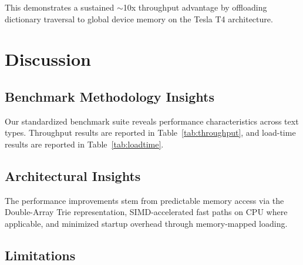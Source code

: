 \documentclass[11pt,a4paper,twocolumn]{article}
\begin{document}
This demonstrates a sustained $\sim$10x throughput advantage by offloading dictionary traversal to global device memory on the Tesla T4 architecture.

\section{Discussion}
\label{sec:discussion}

\subsection{Benchmark Methodology Insights}

Our standardized benchmark suite reveals performance characteristics across text types. Throughput results are reported in Table~\ref{tab:throughput}, and load-time results are reported in Table~\ref{tab:loadtime}.

\subsection{Architectural Insights}

The performance improvements stem from predictable memory access via the Double-Array Trie representation, SIMD-accelerated fast paths on CPU where applicable, and minimized startup overhead through memory-mapped loading.

\subsection{Limitations}
\end{document}
